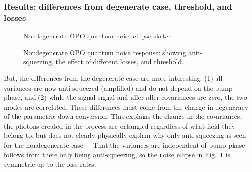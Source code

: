 \subsubsection{Results: differences from degenerate case, threshold, and losses}

\begin{figure}
	\centering
	\caption{Nondegenerate OPO quantum noise ellipse sketch .}
	\label{fig:nOPO_noise_ellipse}
\end{figure}


\begin{figure}
	\centering
	\caption{Nondegenerate OPO quantum noise response: showing anti-squeezing, the effect of different losses, and threshold. }
	\label{fig:nOPO_variances}
\end{figure}

But, the differences from the degenerate case are more interesting: (1) all variances are now anti-squeezed (amplified) and do not depend on the pump phase, and (2) while the signal-signal and idler-idler covariances are zero, the two modes are correlated. These differences must come from the change in degeneracy of the parametric down-conversion. This explains the change in the covariances, the photons created in the process are entangled regardless of what field they belong to, but does not clearly physically explain why only anti-squeezing is seen for the nondegenerate case~\cite{} . That the variances are independent of pump phase follows from there only being anti-squeezing, so the noise ellipse in Fig.~\ref{fig:nOPO_noise_ellipse} is symmetric up to the loss rates.

